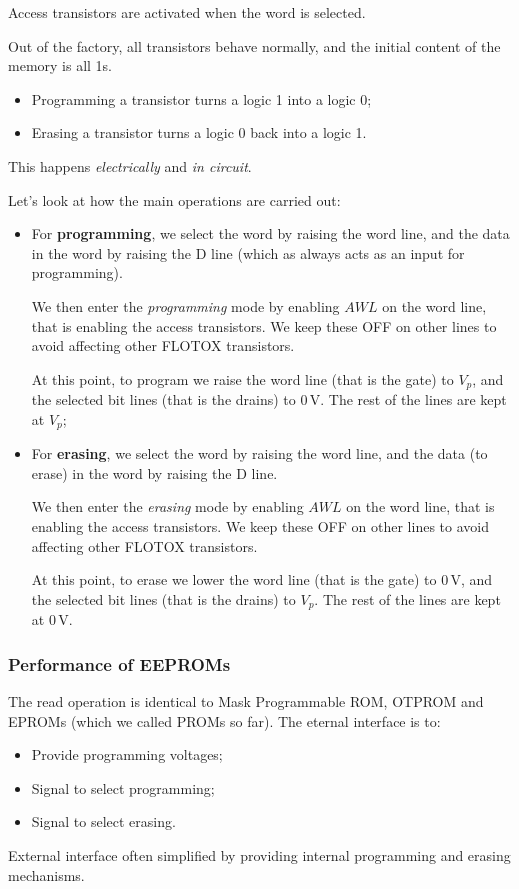 \documentclass[a4paper,11pt]{article}
\begin{document}
Access transistors are activated when the word is selected.

Out of the factory, all transistors behave normally, and the initial content of the memory is all 1s.
\begin{itemize}
	\item Programming a transistor turns a logic 1 into a logic 0;
	\item Erasing a transistor turns a logic 0 back into a logic 1.
\end{itemize}

This happens \textit{electrically} and \textit{in circuit}.

Let's look at how the main operations are carried out:
\begin{itemize}
	\item For \textbf{programming}, we select the word by raising the word line, and the data in the word by raising the D line (which as always acts as an input for programming).

	      We then enter the \textit{programming} mode by enabling $AWL$ on the word line, that is enabling the access transistors. We keep these OFF on other lines to avoid affecting other FLOTOX transistors.

	      At this point, to program we raise the word line (that is the gate) to $V_p$, and the selected bit lines (that is the drains) to $0 \, \mathrm{V}$. The rest of the lines are kept at $V_p$;

	\item For \textbf{erasing}, we select the word by raising the word line, and the data (to erase) in the word by raising the D line.

	      We then enter the \textit{erasing} mode by enabling $AWL$ on the word line, that is enabling the access transistors. We keep these OFF on other lines to avoid affecting other FLOTOX transistors.

	      At this point, to erase we lower the word line (that is the gate) to $0 \, \mathrm{V}$, and the selected bit lines (that is the drains) to $V_p$. The rest of the lines are kept at $0 \, \mathrm{V}$.
\end{itemize}

\subsubsection{Performance of EEPROMs}

The read operation is identical to Mask Programmable ROM, OTPROM and EPROMs (which we called PROMs so far).
The eternal interface is to:
\begin{itemize}
	\item Provide programming voltages;
	\item Signal to select programming;
	\item Signal to select erasing.
\end{itemize}
External interface often simplified by providing internal programming and erasing mechanisms.
\end{document}
